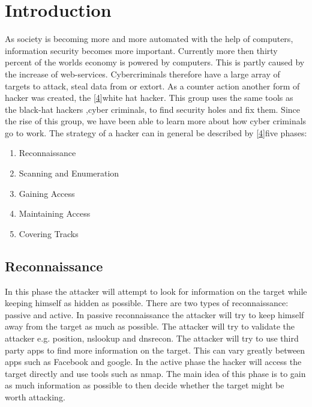 \documentclass{article}%
\begin{document}
\section{Introduction}
As society is becoming more and more automated with the help of computers, information security becomes more important. Currently more then thirty percent of the worlds economy is powered by computers. This is partly caused by the increase of web-services. Cybercriminals therefore have a large array of targets to attack, steal data from or extort. As a counter action another form of hacker was created, the [\hyperlink{4}{4}]white hat hacker. This group uses the same tools as the black-hat hackers ,cyber criminals, to find security holes and fix them. Since the rise of this group, we have been able to learn more about how cyber criminals go to work. The strategy of a hacker can in general be described by [\hyperlink{4}{4}]five phases:
\begin{enumerate}
  \item Reconnaissance
  \item Scanning and Enumeration
  \item Gaining Access
  \item Maintaining Access
  \item Covering Tracks
\end{enumerate}
\subsection{Reconnaissance}
In this phase the attacker will attempt to look for information on the target while keeping himself as hidden as possible. There are two types of reconnaissance: passive and active. In passive reconnaissance the attacker will try to keep himself away from the target as much as possible. The attacker will try to validate the attacker e.g. position, nslookup and dnsrecon. The attacker will try to use third party apps to find more information on the target. This can vary greatly between apps such as Facebook and google. In the active phase the hacker will access the target directly and use tools such as nmap. The main idea of this phase is to gain as much information as possible to then decide whether the target might be worth attacking.
\end{document}
